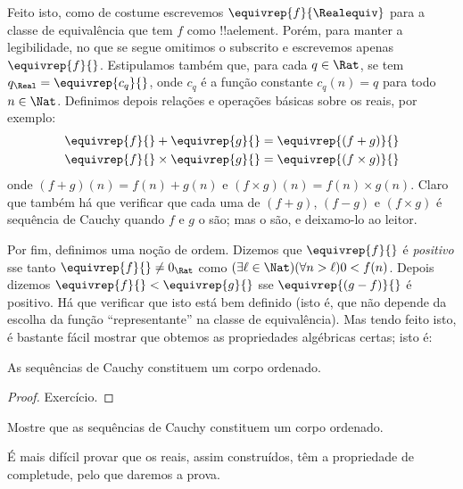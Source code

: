 \documentclass[../../../include/open-logic-section]{subfiles}
\begin{document}
Feito isto, como de costume escrevemos $\equivrep{f}{\Realequiv}$
para a classe de equivalência que tem $f$ como !!a{element}. Porém, para manter a
legibilidade, no que se segue omitimos o subscrito e escrevemos apenas
$\equivrep{f}{}$. Estipulamos também que, para cada $q \in \Rat$,
se tem $q_{\Real} = \equivrep{c_{q}}{}$, onde $c_{q}$ é a função constante
$c_q(n) = q$ para todo $n \in \Nat$. Definimos depois relações e operações
básicas sobre os reais, por exemplo:
\begin{align*}
	\equivrep{f}{} + \equivrep{g}{} &= 	\equivrep{(f + g)}{} \\
	\equivrep{f}{} \times 	\equivrep{g}{} &= \equivrep{(f \times g)}{} 
\end{align*}
onde $(f + g)(n) = f(n) + g(n)$ e $(f \times g)(n) = f(n) \times
g(n)$. Claro que também há que verificar que cada uma de $(f + g)$,
$(f-g)$ e $(f\times g)$ é sequência de Cauchy quando $f$ e $g$ o são;
mas o são, e deixamo-lo ao leitor.

Por fim, definimos uma noção de ordem. Dizemos que $\equivrep{f}{}$ é
\emph{positivo} sse tanto $\equivrep{f}{}\neq 0_\Rat$ como $(\exists
\ell \in \Nat)(\forall n > \ell)0 < f(n)$. Depois dizemos $\equivrep{f}{} <
\equivrep{g}{}$ sse $\equivrep{(g - f)}{}$ é positivo. Há que verificar que isto
está bem definido (isto é, que não depende da escolha da função ``representante''
na classe de equivalência). 
Mas tendo feito isto, é bastante fácil mostrar que obtemos as propriedades algébricas certas; isto é:
\begin{thm}
As sequências de Cauchy constituem um corpo ordenado.
\end{thm}

\begin{proof}
Exercício. 
\end{proof}

\begin{prob}
Mostre que as sequências de Cauchy constituem um corpo ordenado.
\end{prob}

É mais difícil provar que os reais, assim construídos, têm a propriedade de
completude, pelo que daremos a prova.
\end{document}
